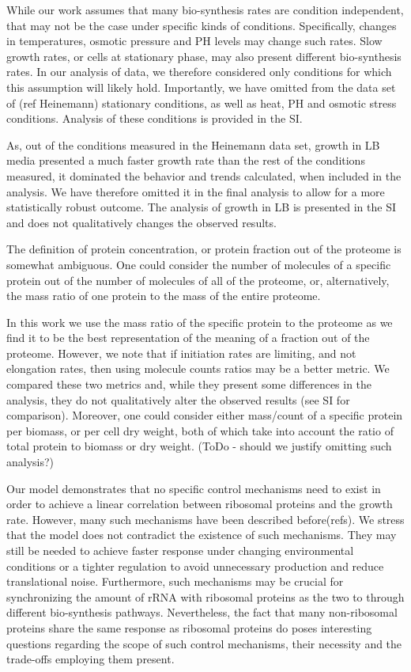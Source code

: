 \documentclass[notitlepage]{article}
\begin{document}
While our work assumes that many bio-synthesis rates are condition independent, that may not be the case under specific kinds of conditions.
Specifically, changes in temperatures, osmotic pressure and PH levels may change such rates.
Slow growth rates, or cells at stationary phase, may also present different bio-synthesis rates.
In our analysis of data, we therefore considered only conditions for which this assumption will likely hold.
Importantly, we have omitted from the data set of (ref Heinemann) stationary conditions, as well as heat, PH and osmotic stress conditions.
Analysis of these conditions is provided in the SI.

As, out of the conditions measured in the Heinemann data set, growth in LB media presented a much faster growth rate than the rest of the conditions measured, it dominated the behavior and trends calculated, when included in the analysis.
We have therefore omitted it in the final analysis to allow for a more statistically robust outcome.
The analysis of growth in LB is presented in the SI and does not qualitatively changes the observed results.

The definition of protein concentration, or protein fraction out of the proteome is somewhat ambiguous.
One could consider the number of molecules of a specific protein out of the number of molecules of all of the proteome, or, alternatively, the mass ratio of one protein to the mass of the entire proteome.

In this work we use the mass ratio of the specific protein to the proteome as we find it to be the best representation of the meaning of a fraction out of the proteome.
However, we note that if initiation rates are limiting, and not elongation rates, then using molecule counts ratios may be a better metric.
We compared these two metrics and, while they present some differences in the analysis, they do not qualitatively alter the observed results (see SI for comparison).
Moreover, one could consider either mass/count of a specific protein per biomass, or per cell dry weight, both of which take into account the ratio of total protein to biomass or dry weight.
(ToDo - should we justify omitting such analysis?)

Our model demonstrates that no specific control mechanisms need to exist in order to achieve a linear correlation between ribosomal proteins and the growth rate.
However, many such mechanisms have been described before(refs).
We stress that the model does not contradict the existence of such mechanisms.
They may still be needed to achieve faster response under changing environmental conditions or a tighter regulation to avoid unnecessary production and reduce translational noise.
Furthermore, such mechanisms may be crucial for synchronizing the amount of rRNA with ribosomal proteins as the two to through different bio-synthesis pathways.
Nevertheless, the fact that many non-ribosomal proteins share the same response as ribosomal proteins do poses interesting questions regarding the scope of such control mechanisms, their necessity and the trade-offs employing them present.
\end{document}
